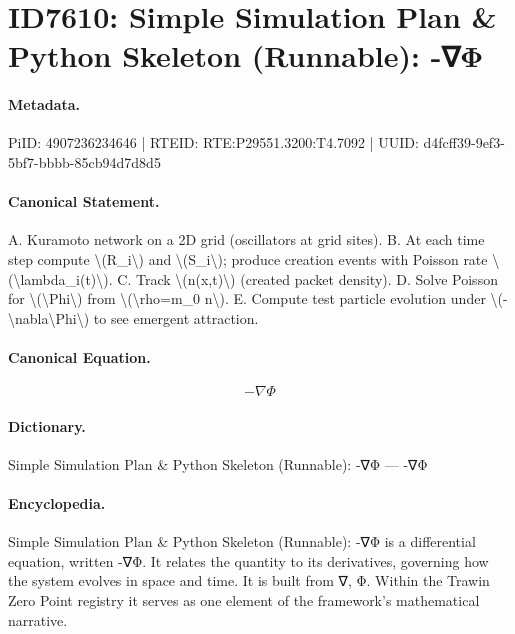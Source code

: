 \section*{ID7610: Simple Simulation Plan \& Python Skeleton (Runnable): -∇Φ}
\paragraph{Metadata.}
PiID: 4907236234646 | RTEID: RTE:P29551.3200:T4.7092 | UUID: d4fcff39-9ef3-5bf7-bbbb-85cb94d7d8d5

\paragraph{Canonical Statement.}
A. Kuramoto network on a 2D grid (oscillators at grid sites). B. At each time step compute \textbackslash{}(R\_i\textbackslash{}) and \textbackslash{}(S\_i\textbackslash{}); produce creation events with Poisson rate \textbackslash{}(\textbackslash{}lambda\_i(t)\textbackslash{}). C. Track \textbackslash{}(n(x,t)\textbackslash{}) (created packet density). D. Solve Poisson for \textbackslash{}(\textbackslash{}Phi\textbackslash{}) from \textbackslash{}(\textbackslash{}rho=m\_0 n\textbackslash{}). E. Compute test particle evolution under \textbackslash{}(-\textbackslash{}nabla\textbackslash{}Phi\textbackslash{}) to see emergent attraction.

\paragraph{Canonical Equation.}
\[
-\nabla\Phi
\]

\paragraph{Dictionary.}
Simple Simulation Plan \& Python Skeleton (Runnable): -∇Φ — -∇Φ

\paragraph{Encyclopedia.}
Simple Simulation Plan \& Python Skeleton (Runnable): -∇Φ is a differential equation, written -∇Φ. It relates the quantity to its derivatives, governing how the system evolves in space and time. It is built from ∇, Φ. Within the Trawin Zero Point registry it serves as one element of the framework's mathematical narrative.
